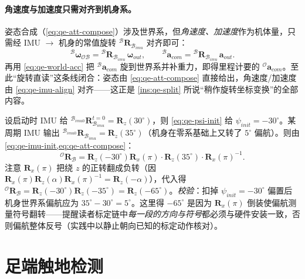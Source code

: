\paragraph{角速度与加速度只需对齐到机身系。}
姿态合成（\cref{eq:qe-att-compose}）涉及世界系，但\emph{角速度、加速度}作为机体量，只需经 IMU $\to$ 机身的常值旋转 ${}^{\mathcal{B}}\mathbf{R}_{\mathcal{B}_{imu}}$ 对齐即可\cite{yu2021quadruped}：
\begin{equation}
  {}^{\mathcal{B}}\boldsymbol{\omega}_{\mathcal{OB}} = {}^{\mathcal{B}}\mathbf{R}_{\mathcal{B}_{imu}}\,\boldsymbol{\omega}_{out},
  \qquad
  {}^{\mathcal{B}}\boldsymbol{a}_{com} = {}^{\mathcal{B}}\mathbf{R}_{\mathcal{B}_{imu}}\,\boldsymbol{a}_{out}.
  \label{eq:qe-imu-align}
\end{equation}
再用 \cref{eq:qe-world-acc} 把 ${}^{\mathcal{B}}\boldsymbol{a}_{com}$ 旋到世界系并补重力，即得里程计要的 ${}^{\mathcal{O}}\boldsymbol{a}_{com}$。至此“旋转直读”这条线闭合：姿态由 \cref{eq:qe-att-compose} 直接给出，角速度/加速度由 \cref{eq:qe-imu-align} 对齐——这正是 \cref{ins:qe-split} 所说“稍作旋转坐标变换”的全部内容。

\begin{example}[标定链一步数值核对]\label{exam:qe-calib}
设启动时 IMU 给 ${}^{\mathcal{B}_{imu0}}\mathbf{R}_{\mathcal{B}_{imu}}^{t=0}=\mathbf{R}_z(30^\circ)$，则 \cref{eq:qe-psi-init} 给 $\psi_{init}=-30^\circ$。某周期 IMU 输出 ${}^{\mathcal{B}_{imu0}}\mathbf{R}_{\mathcal{B}_{imu}}=\mathbf{R}_z(35^\circ)$（机身在零系基础上又转了 $5^\circ$ 偏航）。则由 \cref{eq:qe-imu-init,eq:qe-att-compose}：
\[
  {}^{\mathcal{O}}\mathbf{R}_{\mathcal{B}}
  = \mathbf{R}_z(-30^\circ)\mathbf{R}_x(\pi)\cdot\mathbf{R}_z(35^\circ)\cdot\mathbf{R}_x(\pi)^{-1}.
\]
注意 $\mathbf{R}_x(\pi)$ 把绕 $z$ 的正转翻成负转（因 $\mathbf{R}_x(\pi)\mathbf{R}_z(\alpha)\mathbf{R}_x(\pi)^{-1}=\mathbf{R}_z(-\alpha)$），代入得 ${}^{\mathcal{O}}\mathbf{R}_{\mathcal{B}}=\mathbf{R}_z(-30^\circ)\mathbf{R}_z(-35^\circ)=\mathbf{R}_z(-65^\circ)$。\emph{校验}：扣掉 $\psi_{init}=-30^\circ$ 偏置后机身世界系偏航应为 $35^\circ-30^\circ=5^\circ$。这里得 $-65^\circ$ 是因为 $\mathbf{R}_x(\pi)$ 倒装使偏航测量符号翻转——提醒读者标定链中\emph{每一段的方向与符号}都必须与硬件安装一致，否则偏航整体反号（实践中以静止朝向已知的标定动作核对）。
\end{example}

\section{足端触地检测}
\label{sec:qe-contact}

